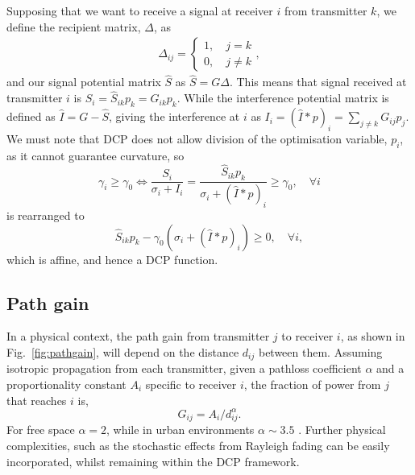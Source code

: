 \documentclass[twocolumn,secnumarabic,amssymb, nobibnotes, aps, prl,superscriptaddress]{revtex4-1}
\begin{document}
Supposing that we want to receive a signal at receiver $i$ from transmitter $k$, we define the recipient matrix, $\Delta$, as
\begin{align*}
\Delta_{ij} = \begin{cases}
1, \quad j=k\\
0, \quad j\neq k
\end{cases},
\end{align*}
and our signal potential matrix $\hat{S}$ as $\hat{S} = G\Delta$.  This means that signal received at transmitter $i$ is $S_i = \hat{S}_{ik}p_k = G_{ik}p_k$.
While the interference potential matrix is defined as $\hat{I} = G-\hat{S}$, giving the interference at $i$ as $I_i = (\hat{I}*p)_i = \sum_{j\neq k}G_{ij}p_j$. We must note that DCP does not allow division of the optimisation variable, $p_i$, as it cannot guarantee curvature, so  
\begin{equation*}
  \gamma_i \geqslant \gamma_0\Longleftrightarrow  \frac{S_i}{\sigma_i + I_i} = \frac{\hat{S}_{ik}p_k}{\sigma_i+(\hat{I}*p)_i} \geqslant \gamma_0, \quad \forall i
\end{equation*}
is rearranged to
\begin{equation*}
\hat{S}_{ik}p_k-\gamma_0(\sigma_i + (\hat{I}*p)_i)\geqslant 0, \quad \forall i,
\end{equation*} 
which is affine, and hence a DCP function.

\subsection{Path gain}
\noindent In a physical context, the path gain from transmitter $j$ to receiver $i$, as shown in Fig.~\ref{fig:pathgain}, will depend on the distance $d_{ij}$ between them. Assuming isotropic propagation from each transmitter, given a pathloss coefficient $\alpha$ and a proportionality constant $A_i$ specific to receiver $i$, the fraction of power from $j$ that reaches $i$ is,
\begin{equation}
G_{ij} = A_i/d_{ij}^\alpha.
\end{equation}
For free space $\alpha = 2$, while in urban environments $\alpha \sim 3.5$ \cite{hata1980}. Further physical complexities, such as the stochastic effects from Rayleigh fading can be easily incorporated, whilst remaining within the DCP framework.
\end{document}
